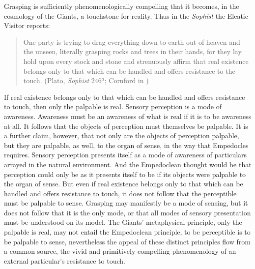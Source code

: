 Grasping is sufficiently phenomenologically compelling that it becomes, in the cosmology of the Giants, a touchstone for reality. Thus in the \emph{Sophist} the Eleatic Visitor reports:
\begin{quote}
    One party is trying to drag everything down to earth out of heaven and the unseen, literally grasping rocks and trees in their hands, for they lay hold upon every stock and stone and strenuously affirm that real existence belongs only to that which can be handled and offers resistance to the touch. (Plato, \emph{Sophist} 246\( ^{a} \); Cornford in \citealt[990]{Hamilton:1989fk})
\end{quote}
If real existence belongs only to that which can be handled and offers resistance to touch, then only the palpable is real. Sensory perception is a mode of awareness. Awareness must be an awareness of what is real if it is to be awareness at all. It follows that the objects of perception must themselves be palpable. It is a further claim, however, that not only are the objects of perception palpable, but they are palpable, as well, to the organ of sense, in the way that Empedocles requires. Sensory perception presents itself as a mode of awareness of particulars arrayed in the natural environment. And the Empedoclean thought would be that perception could only be as it presents itself to be if its objects were palpable to the organ of sense. But even if real existence belongs only to that which can be handled and offers resistance to touch, it does not follow that the perceptible must be palpable to sense. Grasping may manifestly be a mode of sensing, but it does not follow that it is the only mode, or that all modes of sensory presentation must be understood on its model. The Giants' metaphysical principle, only the palpable is real, may not entail the Empedoclean principle, to be perceptible is to be palpable to sense, nevertheless the appeal of these distinct principles flow from a common source, the vivid and primitively compelling phenomenology of an external particular's resistance to touch.

